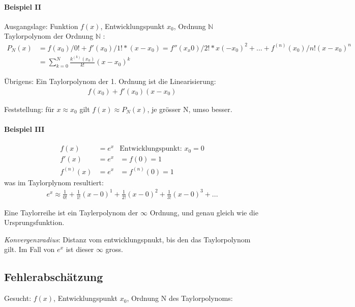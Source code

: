 \paragraph{Beispiel II}

Ausgangslage: Funktion $f(x)$, Entwicklungspunkt $x_0$, Ordnung $\mathbb{N}$ \hfill \\

Taylorpolynom der Ordnung $\mathbb{N}$ : 
\begin{align*}
P_N(x) &= f(x_0)/0! + f'(x_0)/1! * (x - x_0) = f''(x_x0) / 2! * x(-x_0)^2 + ... + f^(n)(x_0)/n! (x-x_0)^n \\
&= \sum^N_{k=0}{\frac{k^{(k)}(x_0)}{k!} (x-x_0)^k}
\end{align*}

Übrigens: Ein Taylorpolynom der 1. Ordnung ist die Linearisierung:
\begin{align*}
	f(x_0) + f'(x_0)(x-x_0)
\end{align*}

Feststellung: für $x \approx x_0$ gilt $f(x) \approx P_N(x)$, je grösser N, umso besser.


\paragraph{Beispiel III}

\begin{align*}
	f(x) &= e^x & \text{Entwicklungspunkt: } x_0=0 \\
	f'(x) &= e^x &= f(0) = 1\\
	f^{(n)}(x) &= e^x &= f^{(n)}(0) = 1
\end{align*}
was im Taylorplynom resultiert:
\begin{align*}
e^x \approx \frac{1}{0!} + \frac{1}{1!}(x-0)^1 + \frac{1}{2!}(x-0)^2 + \frac{1}{3!}(x-0)^3 + ...
\end{align*}

Eine Taylorreihe ist ein Taylerpolynom der $\infty$ Ordnung, und genau gleich wie die Ursprungsfunktion.

\emph{Konvergenzradius}: Distanz vom entwicklungspnukt, bis den das Taylorpolynom gilt. Im Fall von $e^x$ ist dieser $\infty$ gross.

\subsection{Fehlerabschätzung}

Gesucht: $f(x)$, Entwicklungspunkt $x_0$, Ordnung N des Taylorpolynoms:

